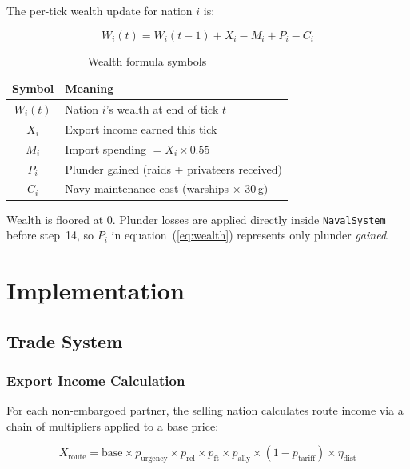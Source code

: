 \documentclass[12pt,a4paper]{article}
\begin{document}
The per-tick wealth update for nation $i$ is:

\begin{equation}
    W_i(t) = W_i(t-1) + X_i - M_i + P_i - C_i
    \label{eq:wealth}
\end{equation}

\begin{table}[h]
\centering
\caption{Wealth formula symbols}
\begin{tabular}{|c|l|}
\hline
\textbf{Symbol} & \textbf{Meaning} \\
\hline
$W_i(t)$ & Nation $i$'s wealth at end of tick $t$ \\
$X_i$    & Export income earned this tick \\
$M_i$    & Import spending $= X_i \times 0.55$ \\
$P_i$    & Plunder gained (raids + privateers received) \\
$C_i$    & Navy maintenance cost (warships $\times$ 30\,g) \\
\hline
\end{tabular}
\end{table}

Wealth is floored at $0$. Plunder losses are applied directly inside \texttt{NavalSystem} before step~14, so $P_i$ in equation~(\ref{eq:wealth}) represents only plunder \textit{gained}.

\section{Implementation}

\subsection{Trade System}

\subsubsection{Export Income Calculation}

For each non-embargoed partner, the selling nation calculates route income via a chain of multipliers applied to a base price:

\begin{equation}
    X_{\text{route}} =
    \text{base}
    \times p_{\text{urgency}}
    \times p_{\text{rel}}
    \times p_{\text{ft}}
    \times p_{\text{ally}}
    \times (1 - p_{\text{tariff}})
    \times \eta_{\text{dist}}
    \label{eq:export}
\end{equation}
\end{document}
